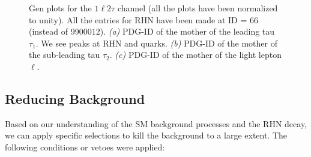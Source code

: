 \documentclass[letterpaper,12pt]{article}
\begin{document}
\vspace{0.7cm}
\begin{figure}[h]
\centering
{}%
\quad
{}%
\quad
{}%
\quad

\caption[Gen plots for \1l2t]{Gen plots for the $1\ell2\tau$ channel (all the plots have been normalized to unity). All the entries for RHN have been made at ID = 66 (instead of 9900012). \emph{(a)} PDG-ID of the mother of the leading tau $\tau_{1}$. We see peaks at RHN and quarks. \emph{(b)} PDG-ID of the mother of the sub-leading tau $\tau_{2}$. \emph{(c)} PDG-ID of the mother of the light lepton $\ell$.}
\label{fig:1l2tgen}  
\end{figure}

\subsection{Reducing Background}
\label{sec:reducebkg}

Based on our understanding of the SM background processes and the RHN decay, we can apply specific selections to kill the background to a large extent. The following conditions or vetoes were applied:
\end{document}
